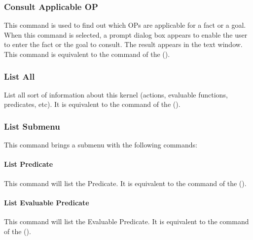 \subsubsection{Consult Applicable OP}

This command is used to find out which OPs are applicable for a fact or a goal.
When this command is selected, a prompt dialog box appears to enable the user
to enter the fact or the goal to consult. The result appears in the text
window. This command is equivalent to the  command of the \CPK{} ().


\subsubsection{List All}

List all sort of information about this kernel (actions, evaluable functions,
predicates, etc).  It is equivalent to the
 command of the \CPK{} ().

\subsubsection{List Submenu}


This command brings a submenu with the following commands:

\paragraph{List Predicate}

This command will list the Predicate. It is equivalent to the  command of the \CPK{} ().

\paragraph{List Evaluable Predicate}

This command will list the Evaluable Predicate. It is equivalent to the
 command of the \CPK{} (). 

